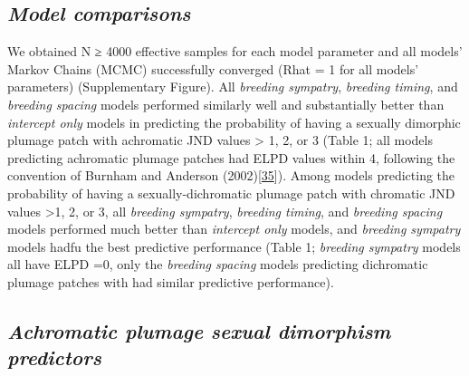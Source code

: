 \documentclass[
  a4paper,
]{article}
\begin{document}
\hypertarget{model-comparisons}{%
\subsection{\texorpdfstring{\emph{Model
comparisons}}{Model comparisons}}\label{model-comparisons}}

We obtained N ≥ 4000 effective samples for each model parameter and all
models' Markov Chains (MCMC) successfully converged (Rhat = 1 for all
models' parameters) (Supplementary Figure). All \emph{breeding
sympatry}, \emph{breeding timing}, and \emph{breeding spacing} models
performed similarly well and substantially better than \emph{intercept
only} models in predicting the probability of having a sexually
dimorphic plumage patch with achromatic JND values \textgreater{} 1, 2,
or 3 (Table 1; all models predicting achromatic plumage patches had ELPD
values within 4, following the convention of Burnham and Anderson
(2002){[}\protect\hyperlink{ref-burnham2002}{35}{]}). Among models
predicting the probability of having a sexually-dichromatic plumage
patch with chromatic JND values \textgreater1, 2, or 3, all
\emph{breeding sympatry}, \emph{breeding timing}, and \emph{breeding
spacing} models performed much better than \emph{intercept only} models,
and \emph{breeding sympatry} models hadfu the best predictive
performance (Table 1; \emph{breeding sympatry} models all have ELPD =0,
only the \emph{breeding spacing} models predicting dichromatic plumage
patches with had similar predictive performance).

\hypertarget{achromatic-plumage-sexual-dimorphism-predictors}{%
\subsection{\texorpdfstring{\emph{Achromatic plumage sexual dimorphism
predictors}}{Achromatic plumage sexual dimorphism predictors}}\label{achromatic-plumage-sexual-dimorphism-predictors}}
\end{document}
